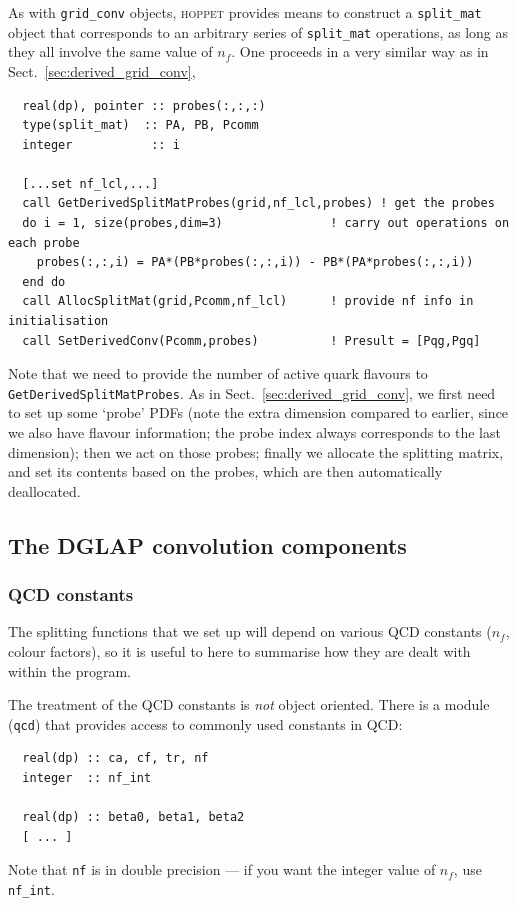 \documentclass[12pt]{article}
\newcommand{\hoppet}{\textsc{hoppet}\xspace}
\newcommand{\ttt}[1]{\texttt{#1}}
\begin{document}
As with \ttt{grid\_conv} objects, \hoppet provides means to construct
a \ttt{split\_mat} object that corresponds to an arbitrary series of
\ttt{split\_mat} operations, as long as they all involve the same
value of $n_f$. One proceeds in a very similar way as
in Sect.~\ref{sec:derived_grid_conv},
\begin{lstlisting}
  real(dp), pointer :: probes(:,:,:)
  type(split_mat)  :: PA, PB, Pcomm
  integer           :: i

  [...set nf_lcl,...]
  call GetDerivedSplitMatProbes(grid,nf_lcl,probes) ! get the probes
  do i = 1, size(probes,dim=3)               ! carry out operations on each probe
    probes(:,:,i) = PA*(PB*probes(:,:,i)) - PB*(PA*probes(:,:,i))
  end do
  call AllocSplitMat(grid,Pcomm,nf_lcl)      ! provide nf info in initialisation
  call SetDerivedConv(Pcomm,probes)          ! Presult = [Pqg,Pgq]
\end{lstlisting}
Note that we need to provide the number of active quark flavours
to \ttt{GetDerivedSplitMatProbes}.
As in Sect.~\ref{sec:derived_grid_conv}, we first need to set up
some `probe' PDFs (note the extra dimension compared to earlier, since
we also have flavour information; the probe index always corresponds
to the last dimension); then we act on those probes; finally we
allocate the splitting matrix, and set its contents based on the
probes, which are then automatically deallocated.



\subsection{The DGLAP convolution components}
\label{sec:dglap_holder}

\subsubsection{QCD constants}
\label{sec:qcd}

The splitting functions that we set up will depend on various QCD
constants ($n_f$, colour factors), so it is useful to here to
summarise how they are dealt with within the program.

The treatment of the QCD constants is \emph{not} object oriented.
There is a module (\ttt{qcd}) that provides access to commonly used
constants in QCD:
\begin{lstlisting}
  real(dp) :: ca, cf, tr, nf
  integer  :: nf_int
  
  real(dp) :: beta0, beta1, beta2
  [ ... ]
\end{lstlisting}
Note that \ttt{nf} is in double precision
 --- if you want the integer value of $n_f$, use \ttt{nf\_int}. 
\end{document}
